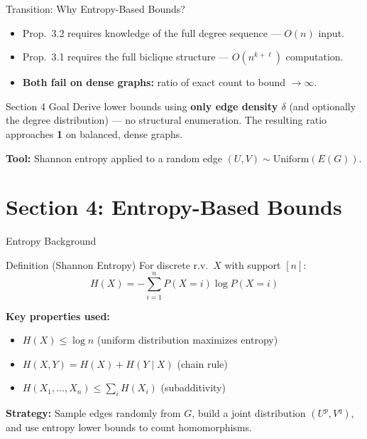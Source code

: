 \documentclass[10pt]{beamer}
\begin{document}
\begin{frame}{Transition: Why Entropy-Based Bounds?}
  \begin{itemize}
    \item Prop.\ 3.2 requires knowledge of the full degree sequence --- $O(n)$ input.
    \item Prop.\ 3.1 requires the full biclique structure --- $O(n^{k+\ell})$ computation.
    \item \textbf{Both fail on dense graphs:} ratio of exact count to bound $\to \infty$.
  \end{itemize}

  \vspace{0.5em}
  \begin{alertblock}{Section 4 Goal}
    Derive lower bounds using \textbf{only edge density $\delta$} (and optionally the degree distribution) --- no structural enumeration. The resulting ratio approaches \textbf{1} on balanced, dense graphs.
  \end{alertblock}

  \vspace{0.3em}
  \textbf{Tool:} Shannon entropy applied to a random edge $(U, V) \sim \mathrm{Uniform}(E(G))$.
\end{frame}

\section{Section 4: Entropy-Based Bounds}

\begin{frame}{Entropy Background}
  \begin{block}{Definition (Shannon Entropy)}
    For discrete r.v.\ $X$ with support $[n]$:
    \[
      H(X) = -\sum_{i=1}^{n} P(X=i) \log P(X=i)
    \]
  \end{block}

  \textbf{Key properties used:}
  \begin{itemize}
    \item $H(X) \leq \log n$ (uniform distribution maximizes entropy)
    \item $H(X,Y) = H(X) + H(Y \mid X)$ (chain rule)
    \item $H(X_1, \ldots, X_n) \leq \sum_i H(X_i)$ (subadditivity)
  \end{itemize}

  \textbf{Strategy:} Sample edges randomly from $G$, build a joint distribution $(U^p, V^q)$, and use entropy lower bounds to count homomorphisms.
\end{frame}
\end{document}

